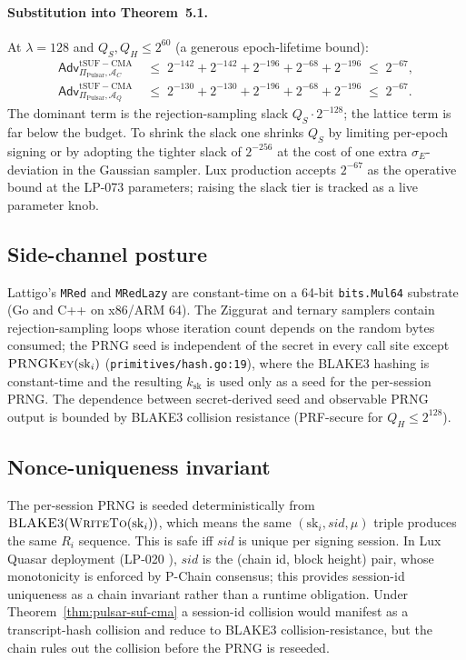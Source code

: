 \paragraph{Substitution into Theorem~5.1.} At $\lambda = 128$ and
$Q_S, Q_H \leq 2^{60}$ (a generous epoch-lifetime bound):
\begin{align*}
  \mathsf{Adv}^{\mathrm{tSUF-CMA}}_{\Pi_{\mathrm{Pulsar}}, \mathcal{A}_C}
  &\;\leq\; 2^{-142} + 2^{-142} + 2^{-196} + 2^{-68} + 2^{-196}
  \;\leq\; 2^{-67}, \\
  \mathsf{Adv}^{\mathrm{tSUF-CMA}}_{\Pi_{\mathrm{Pulsar}}, \mathcal{A}_Q}
  &\;\leq\; 2^{-130} + 2^{-130} + 2^{-196} + 2^{-68} + 2^{-196}
  \;\leq\; 2^{-67}.
\end{align*}
The dominant term is the rejection-sampling slack
$Q_S \cdot 2^{-128}$; the lattice term is far below the budget. To
shrink the slack one shrinks $Q_S$ by limiting per-epoch signing or
by adopting the tighter slack of $2^{-256}$ at the cost of one extra
$\sigma_E$-deviation in the Gaussian sampler. Lux production accepts
$2^{-67}$ as the operative bound at the LP-073 parameters; raising the
slack tier is tracked as a live parameter knob.

\subsection{Side-channel posture}
\label{sec:security:sidechannel}

Lattigo's \texttt{MRed} and \texttt{MRedLazy} \cite{lattigov7} are
constant-time on a 64-bit \texttt{bits.Mul64} substrate (Go and C++ on
x86/ARM 64). The Ziggurat \cite{ziggurat} and ternary samplers contain
rejection-sampling loops whose iteration count depends on the random
bytes consumed; the PRNG seed is independent of the secret in every
call site except $\textsc{PRNGKey}(\mathrm{sk}_i)$
(\texttt{primitives/hash.go:19}), where the BLAKE3 hashing is
constant-time and the resulting $k_{\mathrm{sk}}$ is used only as a
seed for the per-session PRNG. The dependence between secret-derived
seed and observable PRNG output is bounded by BLAKE3 collision
resistance (PRF-secure for $Q_H \leq 2^{128}$).

\subsection{Nonce-uniqueness invariant}
\label{sec:security:nonce}

The per-session PRNG is seeded deterministically from
$\textsc{BLAKE3}(\textsc{WriteTo}(\mathrm{sk}_i))$, which means the
same $(\mathrm{sk}_i, \mathit{sid}, \mu)$ triple produces the same
$R_i$ sequence. This is safe iff $\mathit{sid}$ is unique per signing
session. In Lux Quasar deployment (LP-020 \cite{lp020}), $\mathit{sid}$
is the (chain id, block height) pair, whose monotonicity is enforced by
P-Chain consensus; this provides session-id uniqueness as a chain
invariant rather than a runtime obligation. Under
Theorem~\ref{thm:pulsar-suf-cma} a session-id collision would
manifest as a transcript-hash collision and reduce to BLAKE3
collision-resistance, but the chain rules out the collision before the
PRNG is reseeded.

